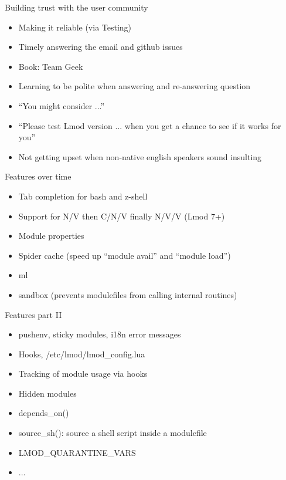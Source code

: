 \documentclass{beamer}
\begin{document}
\begin{frame}{Building trust with the user community}
  \begin{itemize}
    \item Making it reliable (via Testing)
    \item Timely answering the email and github issues 
    \item Book: Team Geek
    \item Learning to be polite when answering and re-answering
      question
    \item ``You might consider ...''
    \item ``Please test Lmod version ... when you get a chance to see
      if it works for you''
    \item Not getting upset when non-native english speakers sound
      insulting
  \end{itemize}
\end{frame}

\begin{frame}{Features over time}
  \begin{itemize}
    \item Tab completion for bash and z-shell
    \item Support for N/V then C/N/V finally N/V/V (Lmod 7+)
    \item Module properties
    \item Spider cache (speed up ``module avail'' and ``module load'')
    \item ml
    \item sandbox (prevents modulefiles from calling internal routines)
  \end{itemize}
\end{frame}

\begin{frame}{Features part II}
  \begin{itemize}
    \item pushenv, sticky modules, i18n error messages
    \item Hooks, /etc/lmod/lmod\_config.lua
    \item Tracking of module usage via hooks
    \item Hidden modules
    \item depends\_on()
    \item source\_sh(): source a shell script inside a modulefile
    \item LMOD\_QUARANTINE\_VARS
    \item ...
  \end{itemize}
\end{frame}
\end{document}
